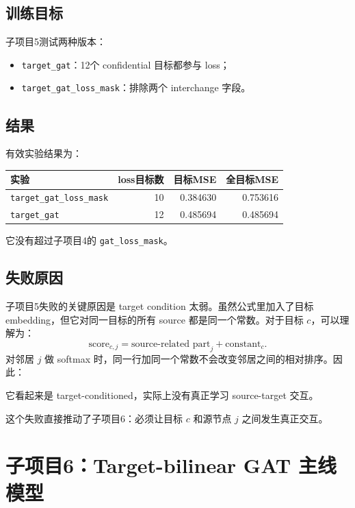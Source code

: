 \documentclass[UTF8]{ctexart}
\begin{document}
\subsection{训练目标}

子项目5测试两种版本：
\begin{itemize}
    \item \texttt{target\_gat}：12个 confidential 目标都参与 loss；
    \item \texttt{target\_gat\_loss\_mask}：排除两个 interchange 字段。
\end{itemize}

\subsection{结果}

有效实验结果为：
\begin{center}
\begin{tabular}{lrrr}
\toprule
实验 & loss目标数 & 目标MSE & 全目标MSE \\
\midrule
\texttt{target\_gat\_loss\_mask} & 10 & 0.384630 & 0.753616 \\
\texttt{target\_gat} & 12 & 0.485694 & 0.485694 \\
\bottomrule
\end{tabular}
\end{center}

它没有超过子项目4的 \texttt{gat\_loss\_mask}。

\subsection{失败原因}

子项目5失败的关键原因是 target condition 太弱。虽然公式里加入了目标 embedding，但它对同一目标的所有 source 都是同一个常数。对于目标 \(c\)，可以理解为：
\[
\text{score}_{c,j}
=
\text{source-related part}_{j}
+
\text{constant}_{c}.
\]
对邻居 \(j\) 做 softmax 时，同一行加同一个常数不会改变邻居之间的相对排序。因此：

\begin{center}
它看起来是 target-conditioned，实际上没有真正学习 source-target 交互。
\end{center}

这个失败直接推动了子项目6：必须让目标 \(c\) 和源节点 \(j\) 之间发生真正交互。

\section{子项目6：Target-bilinear GAT 主线模型}
\end{document}
